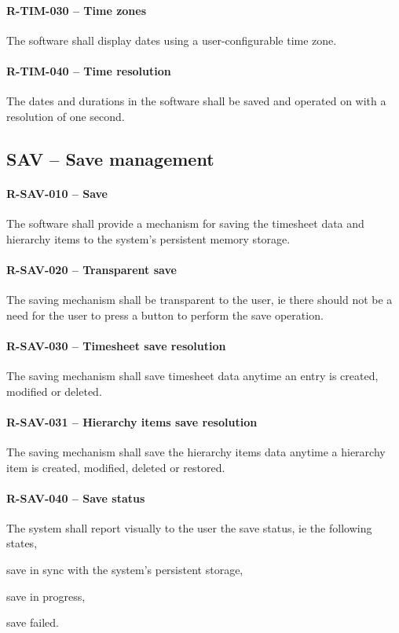\paragraph{R-TIM-030 -- Time zones}
The software shall display dates using a user-configurable time zone.

\paragraph{R-TIM-040 -- Time resolution}
The dates and durations in the software shall be saved and operated
on with a resolution of one second.

\subsection{SAV -- Save management}
\paragraph{R-SAV-010 -- Save}
The software shall provide a mechanism for saving the timesheet data
and hierarchy items to the system's persistent memory storage.

\paragraph{R-SAV-020 -- Transparent save}
The saving mechanism shall be transparent to the user, ie there should
not be a need for the user to press a button to perform the save operation.

\paragraph{R-SAV-030 -- Timesheet save resolution}
The saving mechanism shall save timesheet data anytime an entry is
created, modified or deleted.

\paragraph{R-SAV-031 -- Hierarchy items save resolution}
The saving mechanism shall save the hierarchy items data anytime
a hierarchy item is created, modified, deleted or restored.

\paragraph{R-SAV-040 -- Save status}
The system shall report visually to the user the save status, ie
the following states,
\begin{compactitem}
  \item save in sync with the system's persistent storage,
  \item save in progress,
  \item save failed.
\end{compactitem}

